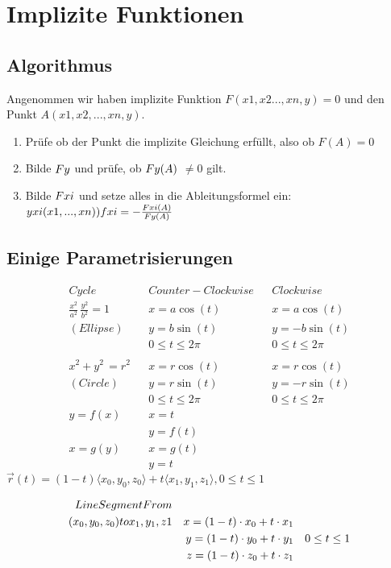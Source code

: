 \section{Implizite Funktionen}
\subsection {Algorithmus}
\begin{footnotesize}

Angenommen wir haben implizite Funktion $F(x1,x2...,xn,y) = 0$ und den Punkt $A(x1,x2,...,xn,y)$.
\begin{enumerate}
	\item Prüfe ob der Punkt die implizite Gleichung erfüllt, also ob $F(A) = 0$
	\item Bilde $F\MakeLowercase{y}$ und prüfe, ob $F\MakeLowercase{y}(A)$ $\neq 0$ gilt.
	\item Bilde $F\MakeLowercase{xi}$ und setze alles in die Ableitungsformel ein:
	$y\MakeLowercase{xi}(x1,...,xn)) f\MakeLowercase{xi} = -\frac{F\MakeLowercase{xi}(A)}{F\MakeLowercase{y}(A)}$
\end{enumerate}
\end{footnotesize}
\subsection{Einige Parametrisierungen}
\begin{align*}
Cycle && Counter-Clockwise && Clockwise \\
\frac{x^2}{a^2}\, \frac{y^2}{b^2} = 1 && x = a\cos(t) && x= a\cos(t) \\
(Ellipse)&&y=b\sin(t) &&y=-b\sin(t)\\
&&0\leq t \leq 2\pi &&0\leq t \leq 2\pi\\
\\
x^2+y^2\, = r^2 && x = r\cos(t) && x= r\cos(t) \\
(Circle)&&y=r\sin(t) &&y=-r\sin(t)\\
&&0\leq t \leq 2\pi &&0\leq t \leq 2\pi\\
y=f(x) && x= t \\
&& y=f(t)\\
x=g(y) && x=g(t)\\
&&y=t
\end{align*}
$\vec{r}(t)=(1-t)\langle x_0, y_{0}, z_{0}\rangle +t\langle x_{1}, y_{1}, z_{1}\rangle, 0\leq t \leq 1$

\begin{align*}
Line Segment From && && \\
(x_{0}, y_{0}, z_{0}) to x_{1}, y_{1}, z\MakeLowercase{1}&& x=(1-t)\cdot x_{0} + t\cdot x_{1}&&\\
 && y=(1-t)\cdot y_{0} + t\cdot y_{1}&& 0 \leq t \leq 1 \\
  &&  z=(1-t)\cdot z_{0} + t\cdot z_{1}
\end{align*}


